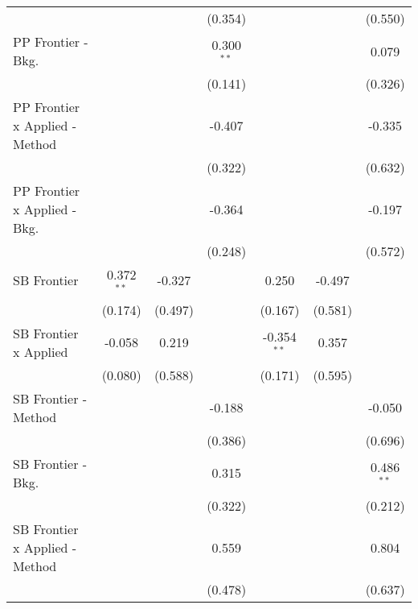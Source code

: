 \begin{tabular}{lcccccc}
                                  &               &         & (0.354)      &               &              & (0.550)\\   
   PP Frontier - Bkg.             &               &         & 0.300$^{**}$ &               &              & 0.079\\   
                                  &               &         & (0.141)      &               &              & (0.326)\\   
   PP Frontier x Applied - Method &               &         & -0.407       &               &              & -0.335\\   
                                  &               &         & (0.322)      &               &              & (0.632)\\   
   PP Frontier x Applied - Bkg.   &               &         & -0.364       &               &              & -0.197\\   
                                  &               &         & (0.248)      &               &              & (0.572)\\   
   SB Frontier                    & 0.372$^{**}$  & -0.327  &              & 0.250         & -0.497       &   \\   
                                  & (0.174)       & (0.497) &              & (0.167)       & (0.581)      &   \\   
   SB Frontier x Applied          & -0.058        & 0.219   &              & -0.354$^{**}$ & 0.357        &   \\   
                                  & (0.080)       & (0.588) &              & (0.171)       & (0.595)      &   \\   
   SB Frontier - Method           &               &         & -0.188       &               &              & -0.050\\   
                                  &               &         & (0.386)      &               &              & (0.696)\\   
   SB Frontier - Bkg.             &               &         & 0.315        &               &              & 0.486$^{**}$\\   
                                  &               &         & (0.322)      &               &              & (0.212)\\   
   SB Frontier x Applied - Method &               &         & 0.559        &               &              & 0.804\\   
                                  &               &         & (0.478)      &               &              & (0.637)\\   

\end{tabular}
